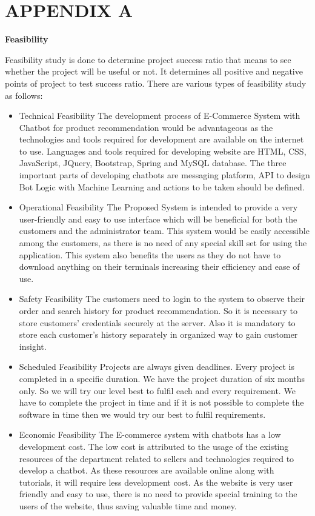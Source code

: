 \documentclass[oneside,a4paper,12pt]{book}
\begin{document}
\section{APPENDIX A}
\textbf{Feasibility} 
\par 
Feasibility study is done to determine project success ratio that means to see whether the project will be useful or not. It determines all positive and negative points of project to test success ratio. There are various types of feasibility study as follows:
\begin{itemize}
    \item Technical Feasibility
    The development process of E-Commerce System with Chatbot for product recommendation would be advantageous as the technologies and tools required for development are available on the internet to use. Languages and tools required for developing website are HTML, CSS, JavaScript, JQuery, Bootstrap, Spring and MySQL database. The three important parts of developing chatbots are messaging platform, API to design Bot Logic with Machine Learning and actions to be taken should be defined.
    \item Operational Feasibility
    The Proposed System is intended to provide a very user-friendly and easy to use interface which will be beneficial for both the customers and the administrator team. This system would be easily accessible among the customers, as there is no need of any special skill set for using the application. This system also benefits the users as they do not have to download anything on their terminals increasing their efficiency and ease of use.
    \item Safety Feasibility
    The customers need to login to the system to observe their order and search history for product recommendation. So it is necessary to store customers’ credentials securely at the server. Also it is mandatory to store each customer’s history separately in organized way to gain customer insight.
    \item Scheduled Feasibility
    Projects are always given deadlines. Every project is completed in a specific duration. We have the project duration of six months only. So we will try our level best to fulfil each and every requirement. We have to complete the project in time and if it is not possible to complete the software in time then we would try our best to fulfil requirements.
    \item Economic Feasibility
    The E-commerce system with chatbots has a low development cost. The low cost is attributed to the usage of the existing resources of the department related to sellers and technologies required to develop a chatbot. As these resources are available online along with tutorials, it will require less development cost. As the website is very user friendly and easy to use, there is no need to provide special training to the users of the website, thus saving valuable time and money.
\end{itemize}
\end{document}
